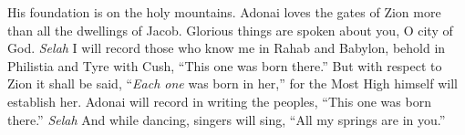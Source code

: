 \begin{biblechapter} %
 His foundation is on the holy mountains.
\verse Adonai loves the gates of Zion 
more than all the dwellings of Jacob.
\verse Glorious things are spoken about you, 
O city of God. \textit{Selah}
\verse I will record those who know me 
in Rahab and Babylon, 
behold in Philistia and Tyre with Cush, 
“This one was born there.”
\verse But with respect to Zion it shall be said, 
“\textit{Each one} was born in her,” 
for the Most High himself will establish her.
\verse Adonai will record in writing the peoples, 
“This one was born there.” \textit{Selah}
\verse And while dancing, singers will sing, 
“All my springs are in you.”
\end{biblechapter}

